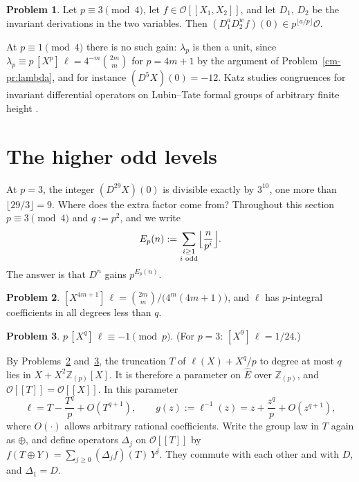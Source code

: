 \documentclass[reqno]{amsart}
\theoremstyle{definition}
\newtheorem{problem}{Problem}[section]
\theoremstyle{plain}
\newcommand{\Z}{\mathbb{Z}}
\newcommand{\Oc}{\mathcal{O}}
\begin{document}
\begin{problem}\label{pr:first-gain}
Let \(p \equiv 3 \pmod 4\), let \(f \in \Oc[[X_1, X_2]]\), and let \(D_1\), \(D_2\) be the invariant derivations in the two variables.  Then \((D_1^a D_2^w f)(0) \in p^{\lfloor a/p \rfloor}\Oc\).
\end{problem}

At \(p \equiv 1 \pmod 4\) there is no such gain: \(\lambda_p\) is then a unit, since \(\lambda_p \equiv p\,[X^p]\,\ell = 4^{-m}\binom{2m}{m}\) for \(p = 4m+1\) by the argument of Problem~\ref{cm-pr:lambda}, and for instance \((D^5X)(0) = -12\).  Katz studies congruences for invariant differential operators on Lubin--Tate formal groups of arbitrary finite height \cite[\S II]{Ka}.

\section{The higher odd levels}\label{sec:odd}

At \(p = 3\), the integer \((D^{29}X)(0)\) is divisible exactly by \(3^{10}\), one more than \(\lfloor 29/3 \rfloor = 9\).  Where does the extra factor come from?  Throughout this section \(p \equiv 3 \pmod 4\) and \(q := p^2\), and we write
\[
  E_p(n) := \sum_{\substack{i \ge 1 \\ i \text{ odd}}} \Bigl\lfloor \frac{n}{p^i} \Bigr\rfloor .
\]
The answer is that \(D^n\) gains \(p^{E_p(n)}\).

\begin{problem}\label{pr:log-integral}
\([X^{4m+1}]\, \ell = \binom{2m}{m} / \bigl(4^m (4m+1)\bigr)\), and \(\ell\) has \(p\)-integral coefficients in all degrees less than \(q\).
\end{problem}

\begin{problem}\label{pr:log-q}
\(p\, [X^q]\, \ell \equiv -1 \pmod p\).  (For \(p = 3\): \([X^9]\, \ell = 1/24\).)
\end{problem}

By Problems~\ref{pr:log-integral} and~\ref{pr:log-q}, the truncation \(T\) of \(\ell(X) + X^q/p\) to degree at most \(q\) lies in \(X + X^2\Z_{(p)}[X]\).  It is therefore a parameter on \(\hat E\) over \(\Z_{(p)}\), and \(\Oc[[T]] = \Oc[[X]]\).  In this parameter
\[
  \ell = T - \frac{T^q}{p} + O(T^{q+1}),
  \qquad
  g(z) := \ell^{-1}(z) = z + \frac{z^q}{p} + O(z^{q+1}),
\]
where \(O(\cdot)\) allows arbitrary rational coefficients.  Write the group law in \(T\) again as \(\oplus\), and define operators \(\Delta_j\) on \(\Oc[[T]]\) by \(f(T \oplus Y) = \sum_{j \ge 0} (\Delta_j f)(T)\, Y^j\).  They commute with each other and with \(D\), and \(\Delta_1 = D\).
\end{document}
